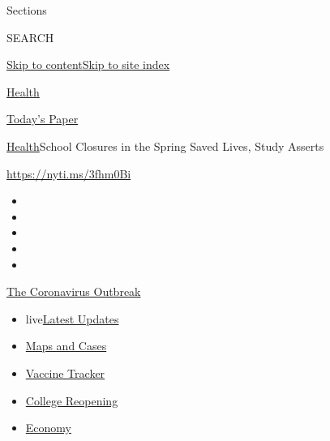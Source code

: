 Sections

SEARCH

\protect\hyperlink{site-content}{Skip to
content}\protect\hyperlink{site-index}{Skip to site index}

\href{https://www.nytimes3xbfgragh.onion/section/health}{Health}

\href{https://myaccount.nytimes3xbfgragh.onion/auth/login?response_type=cookie\&client_id=vi}{}

\href{https://www.nytimes3xbfgragh.onion/section/todayspaper}{Today's
Paper}

\href{/section/health}{Health}\textbar{}School Closures in the Spring
Saved Lives, Study Asserts

\url{https://nyti.ms/3fhm0Bi}

\begin{itemize}
\item
\item
\item
\item
\item
\end{itemize}

\href{https://www.nytimes3xbfgragh.onion/news-event/coronavirus?action=click\&pgtype=Article\&state=default\&region=TOP_BANNER\&context=storylines_menu}{The
Coronavirus Outbreak}

\begin{itemize}
\tightlist
\item
  live\href{https://www.nytimes3xbfgragh.onion/2020/08/04/world/coronavirus-cases.html?action=click\&pgtype=Article\&state=default\&region=TOP_BANNER\&context=storylines_menu}{Latest
  Updates}
\item
  \href{https://www.nytimes3xbfgragh.onion/interactive/2020/us/coronavirus-us-cases.html?action=click\&pgtype=Article\&state=default\&region=TOP_BANNER\&context=storylines_menu}{Maps
  and Cases}
\item
  \href{https://www.nytimes3xbfgragh.onion/interactive/2020/science/coronavirus-vaccine-tracker.html?action=click\&pgtype=Article\&state=default\&region=TOP_BANNER\&context=storylines_menu}{Vaccine
  Tracker}
\item
  \href{https://www.nytimes3xbfgragh.onion/2020/08/02/us/covid-college-reopening.html?action=click\&pgtype=Article\&state=default\&region=TOP_BANNER\&context=storylines_menu}{College
  Reopening}
\item
  \href{https://www.nytimes3xbfgragh.onion/live/2020/08/04/business/stock-market-today-coronavirus?action=click\&pgtype=Article\&state=default\&region=TOP_BANNER\&context=storylines_menu}{Economy}
\end{itemize}

